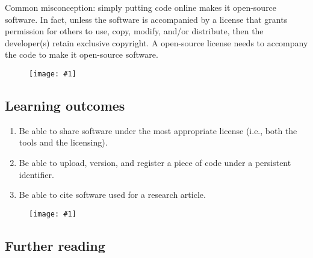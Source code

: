 \documentclass{article}
\newlength{\imgwidth}
\newcommand\scaledgraphics[2]{%
                
\settowidth{\imgwidth}{\texttt{[image: \#1]}}%
                
\setlength{\imgwidth}{\minof{\imgwidth}{#2\textwidth}}%
                
\texttt{[image: \#1]}%
                
}
\begin{document}
Common misconception: simply putting code online makes it open-source software. In fact, unless the software is accompanied by a license that grants permission for others to use, copy, modify, and/or distribute, then the developer(s) retain exclusive copyright. A open-source license needs to accompany the code to make it open-source software.

\begin{figure}
\scaledgraphics{78242a58-956c-4a6f-8d50-a93e47eb21b4.png}{1}
\label{F20917651}
\end{figure}


\subsection{Learning outcomes}\label{learning-outcomes}


\begin{enumerate}
\item Be able to share software under the most appropriate license (i.e., both the tools and the licensing).


\item Be able to upload, version, and register a piece of code under a persistent identifier.


\item Be able to cite software used for a research article.


\end{enumerate}
\begin{figure}
\scaledgraphics{28184297-5028-4ac9-bc5f-7a459edf50cf.png}{1}
\label{F41126311}
\end{figure}


\subsection{Further reading}\label{further-reading}
\end{document}
